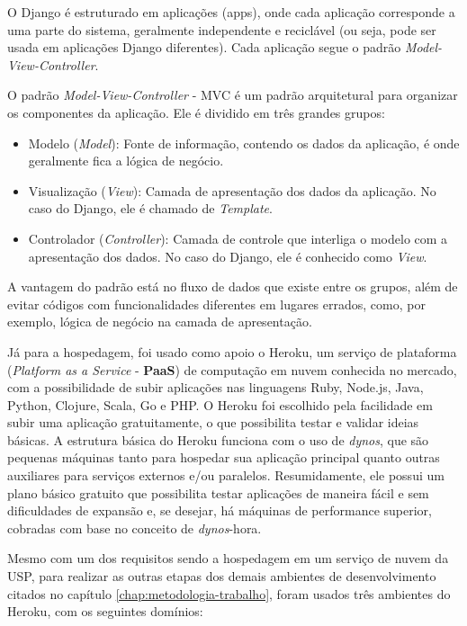 O Django é estruturado em aplicações (apps), onde cada aplicação corresponde a uma parte do sistema, geralmente independente e reciclável (ou seja, pode ser usada em aplicações Django diferentes). Cada aplicação segue o padrão \textit{Model-View-Controller}.

O padrão \textit{Model-View-Controller} - MVC é um padrão arquitetural para organizar os componentes da aplicação. Ele é dividido em três grandes grupos\cite{thedjangobook2018}:

\begin{itemize}
    \item Modelo (\textit{Model}): Fonte de informação, contendo os dados da aplicação, é onde geralmente fica a lógica de negócio.
    \item Visualização (\textit{View}): Camada de apresentação dos dados da aplicação. No caso do Django, ele é chamado de \textit{Template}.
    \item Controlador (\textit{Controller}): Camada de controle que interliga o modelo com a apresentação dos dados. No caso do Django, ele é conhecido como \textit{View}.
\end{itemize}

A vantagem do padrão está no fluxo de dados que existe entre os grupos, além de evitar códigos com funcionalidades diferentes em lugares errados, como, por exemplo, lógica de negócio na camada de apresentação.

Já para a hospedagem, foi usado como apoio o Heroku, um serviço de plataforma (\textit{Platform as a Service} - \textbf{PaaS}) de computação em nuvem conhecida no mercado, com a possibilidade de subir aplicações nas linguagens Ruby, Node.js, Java, Python, Clojure, Scala, Go e PHP. O Heroku foi escolhido pela facilidade em subir uma aplicação gratuitamente, o que possibilita testar e validar ideias básicas. A estrutura básica do Heroku funciona com o uso de \textit{dynos}, que são pequenas máquinas tanto para hospedar sua aplicação principal quanto outras auxiliares para serviços externos e/ou paralelos. Resumidamente, ele possui um plano básico gratuito que possibilita testar aplicações de maneira fácil e sem dificuldades de expansão e, se desejar, há máquinas de performance superior, cobradas com base no conceito de \textit{dynos}-hora.

Mesmo com um dos requisitos sendo a hospedagem em um serviço de nuvem da USP, para realizar as outras etapas dos demais ambientes de desenvolvimento citados no capítulo \ref{chap:metodologia-trabalho}, foram usados três ambientes do Heroku, com os seguintes domínios:

